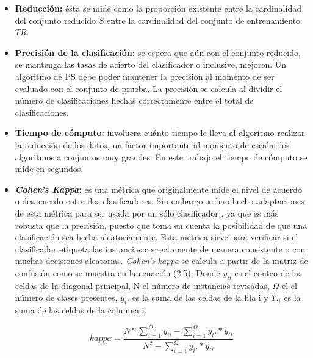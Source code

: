 \begin{itemize}
\item \textbf{Reducción: }
ésta se mide como la proporción existente entre la cardinalidad del conjunto reducido $S$ entre la cardinalidad del conjunto de entrenamiento $TR$. 


\item \textbf{Precisión de la clasificación: }
se espera que aún con el conjunto reducido, se mantenga las tasas de acierto del clasificador o inclusive, mejoren. Un algoritmo de PS debe poder mantener la precisión al momento de ser evaluado con el conjunto de prueba. La precisión se calcula al dividir el número de clasificaciones hechas correctamente entre el total de clasificaciones.

\item \textbf{Tiempo de cómputo: }
involucra cuánto tiempo le lleva al algoritmo realizar la reducción de los datos, un factor importante al momento de escalar los algoritmos a conjuntos muy grandes. En este trabajo el tiempo de cómputo se mide en segundos.

\item \textbf{\emph{Cohen's Kappa}: } 
es una métrica que originalmente mide el nivel de acuerdo o desacuerdo entre dos clasificadores. Sin embargo se han hecho adaptaciones de esta métrica para ser usada por un sólo clasificador \cite{garcia2012prototype}, ya que es más robusta que la precisión, puesto que toma en cuenta la posibilidad de que una clasificación sea hecha aleatoriamente. Esta métrica sirve para verificar si el clasificador etiqueta las instancias correctamente de manera consistente o con muchas decisiones aleatorias. \emph{Cohen's kappa} se calcula a partir de la matriz de confusión como se muestra en la ecuación (2.5). Donde $y_{ii}$ es el conteo de las celdas de la diagonal principal, N el número de instancias revisadas, $\Omega$ el el número de clases presentes, $y_i.$ es la suma de las celdas de la fila i y $Y._i$ es la suma de las celdas de la columna i.

\begin{equation} 
kappa = \frac{N*\sum_{i=1}^{\Omega}y_{ii} - \sum_{i=1}^{\Omega}y_i.*y._i}{N^2 - \sum_{i=1}^{\Omega}y_i.*y._i}
\end{equation}

\end{itemize}


